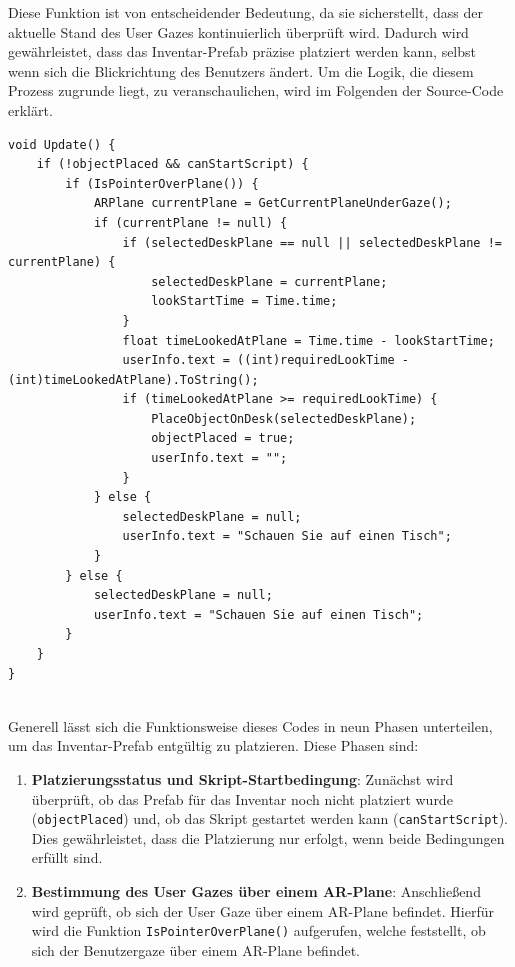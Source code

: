 \begin{itemize}
Diese Funktion ist von entscheidender Bedeutung, da sie sicherstellt, dass der aktuelle Stand des User Gazes kontinuierlich
überprüft wird. Dadurch wird gewährleistet, dass das Inventar-Prefab präzise platziert werden kann, selbst wenn sich die
Blickrichtung des Benutzers ändert. Um die Logik, die diesem Prozess zugrunde liegt, zu veranschaulichen, wird im Folgenden
der Source-Code erklärt.
\begin{lstlisting}[caption={Funktion um Usergaze zu verwenden}, label=code:isPOP]
void Update() {
    if (!objectPlaced && canStartScript) {
        if (IsPointerOverPlane()) {
            ARPlane currentPlane = GetCurrentPlaneUnderGaze();
            if (currentPlane != null) {
                if (selectedDeskPlane == null || selectedDeskPlane != currentPlane) {
                    selectedDeskPlane = currentPlane;
                    lookStartTime = Time.time;
                }
                float timeLookedAtPlane = Time.time - lookStartTime;
                userInfo.text = ((int)requiredLookTime - (int)timeLookedAtPlane).ToString();
                if (timeLookedAtPlane >= requiredLookTime) {
                    PlaceObjectOnDesk(selectedDeskPlane);
                    objectPlaced = true;
                    userInfo.text = "";
                }
            } else {
                selectedDeskPlane = null;
                userInfo.text = "Schauen Sie auf einen Tisch";
            }
        } else {
            selectedDeskPlane = null;
            userInfo.text = "Schauen Sie auf einen Tisch";
        }
    }
}
\end{lstlisting}\\
Generell lässt sich die Funktionsweise dieses Codes in neun Phasen unterteilen, um das Inventar-Prefab entgültig zu platzieren. Diese Phasen sind:

\begin{enumerate}
    \item \textbf{Platzierungsstatus und Skript-Startbedingung}: Zunächst wird überprüft, ob das Prefab für das Inventar
    noch nicht platziert wurde (\texttt{objectPlaced}) und, ob das Skript gestartet werden kann (\texttt{canStartScript}).
    Dies gewährleistet, dass die Platzierung nur erfolgt, wenn beide Bedingungen erfüllt sind.

    \item \textbf{Bestimmung des User Gazes über einem AR-Plane}: Anschließend wird geprüft, ob sich der User Gaze über einem
    AR-Plane befindet. Hierfür wird die Funktion \texttt{IsPointerOverPlane()} aufgerufen, welche feststellt, ob sich der
    Benutzergaze über einem AR-Plane befindet.


\end{enumerate}
\end{itemize}
